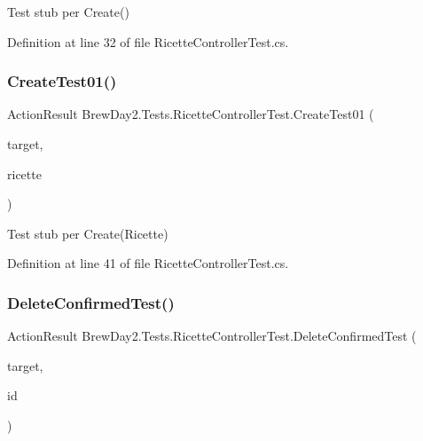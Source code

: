 Test stub per Create()



Definition at line 32 of file Ricette\+Controller\+Test.\+cs.

\mbox{\label{class_brew_day2_1_1_tests_1_1_ricette_controller_test_ad28ff7d3a50772dc34cc2b9a2b826a06}} 
\subsubsection{\texorpdfstring{Create\+Test01()}{CreateTest01()}}
{\footnotesize\ttfamily Action\+Result Brew\+Day2.\+Tests.\+Ricette\+Controller\+Test.\+Create\+Test01 (\begin{DoxyParamCaption}\item[{\mbox{[}\+Pex\+Assume\+Under\+Test\mbox{]} \mbox{\hyperlink{class_brew_day2_1_1_controllers_1_1_ricette_controller}{Ricette\+Controller}}}]{target,  }\item[{\mbox{\hyperlink{class_brew_day2_1_1_models_1_1_ricette}{Ricette}}}]{ricette }\end{DoxyParamCaption})}



Test stub per Create(\+Ricette)



Definition at line 41 of file Ricette\+Controller\+Test.\+cs.

\mbox{\label{class_brew_day2_1_1_tests_1_1_ricette_controller_test_a4045be56144ee713bf32fb8a533da41f}} 
\subsubsection{\texorpdfstring{Delete\+Confirmed\+Test()}{DeleteConfirmedTest()}}
{\footnotesize\ttfamily Action\+Result Brew\+Day2.\+Tests.\+Ricette\+Controller\+Test.\+Delete\+Confirmed\+Test (\begin{DoxyParamCaption}\item[{\mbox{[}\+Pex\+Assume\+Under\+Test\mbox{]} \mbox{\hyperlink{class_brew_day2_1_1_controllers_1_1_ricette_controller}{Ricette\+Controller}}}]{target,  }\item[{int}]{id }\end{DoxyParamCaption})}




